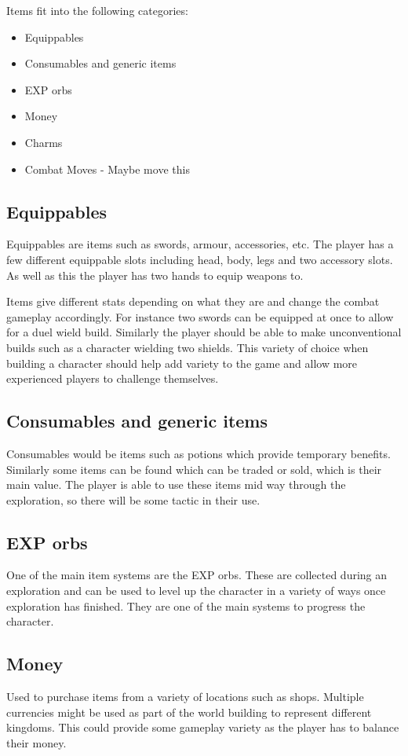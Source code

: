\documentclass[a4paper]{scrreprt}
\begin{document}
\vspace{5mm}
Items fit into the following categories:
    \begin{itemize}
        \item Equippables
        \item Consumables and generic items
        \item EXP orbs
        \item Money
        \item Charms
        \item Combat Moves - Maybe move this
    \end{itemize}

\subsection{Equippables}
Equippables are items such as swords, armour, accessories, etc.
The player has a few different equippable slots including head, body, legs and two accessory slots.
As well as this the player has two hands to equip weapons to.

Items give different stats depending on what they are and change the combat gameplay accordingly.
For instance two swords can be equipped at once to allow for a duel wield build.
Similarly the player should be able to make unconventional builds such as a character wielding two shields.
This variety of choice when building a character should help add variety to the game and allow more experienced players to challenge themselves.

\subsection{Consumables and generic items}
Consumables would be items such as potions which provide temporary benefits.
Similarly some items can be found which can be traded or sold, which is their main value.
The player is able to use these items mid way through the exploration, so there will be some tactic in their use.

\subsection{EXP orbs}
One of the main item systems are the EXP orbs.
These are collected during an exploration and can be used to level up the character in a variety of ways once exploration has finished.
They are one of the main systems to progress the character.

\subsection{Money}
Used to purchase items from a variety of locations such as shops.
Multiple currencies might be used as part of the world building to represent different kingdoms.
This could provide some gameplay variety as the player has to balance their money.
\end{document}
